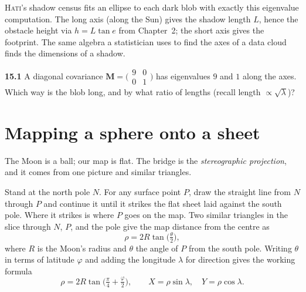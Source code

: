\documentclass[11pt,oneside]{book}
\begin{document}
\begin{center}
\end{center}

\begin{hatibox}
\textsc{Hati}'s shadow census fits an ellipse to each dark blob with exactly this
eigenvalue computation. The long axis (along the Sun) gives the shadow length $L$,
hence the obstacle height via $h=L\tan e$ from Chapter~2; the short axis gives the
footprint. The same algebra a statistician uses to find the axes of a data cloud finds
the dimensions of a shadow.
\end{hatibox}

\begin{practice}
\textbf{15.1} A diagonal covariance $\mathbf M=\big(\begin{smallmatrix}9&0\\0&1
\end{smallmatrix}\big)$ has eigenvalues $9$ and $1$ along the axes. Which way is the
blob long, and by what ratio of lengths (recall length $\propto\sqrt{\lambda}$)?
\end{practice}

\chapter{Mapping a sphere onto a sheet}

The Moon is a ball; our map is flat. The bridge is the \emph{stereographic projection},
and it comes from one picture and similar triangles.

Stand at the north pole $N$. For any surface point $P$, draw the straight line from $N$
through $P$ and continue it until it strikes the flat sheet laid against the south pole.
Where it strikes is where $P$ goes on the map. Two similar triangles in the slice
through $N$, $P$, and the pole give the map distance from the centre as
\begin{equation}
\rho=2R\tan\!\Big(\tfrac{\theta}{2}\Big),
\end{equation}
where $R$ is the Moon's radius and $\theta$ the angle of $P$ from the south pole.
Writing $\theta$ in terms of latitude $\varphi$ and adding the longitude $\lambda$ for
direction gives the working formula
\begin{equation}
\rho=2R\tan\!\Big(\tfrac{\pi}{4}+\tfrac{\varphi}{2}\Big),\qquad
X=\rho\sin\lambda,\quad Y=\rho\cos\lambda.
\end{equation}
\end{document}
